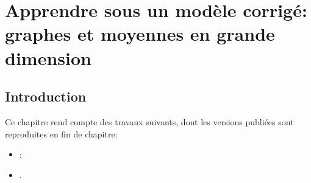 \chapter{Apprendre sous un modèle corrigé: graphes et moyennes en grande dimension}
\label{ch:learning}

\section{Introduction}
\label{sec:learning-introduction}

\begin{contributions}
  Ce chapitre rend compte des travaux suivants, dont les versions publiées sont
  reproduites en fin de chapitre:
  \begin{itemize}
    \item {};
    \item {}.
  \end{itemize}
\end{contributions}



